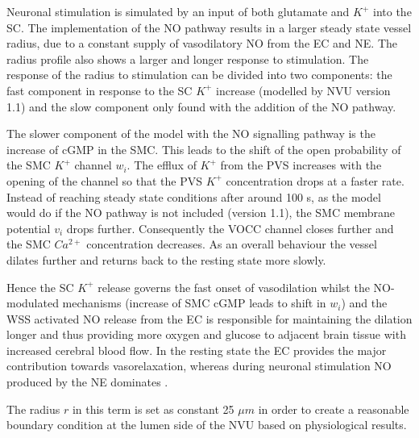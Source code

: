 		Neuronal stimulation is simulated by an input of both glutamate and $K^+$ into the SC. The implementation of the NO pathway results in a larger steady state vessel radius, due to a constant supply of vasodilatory NO from the EC and NE. The radius profile also shows a larger and longer response to stimulation. 
		The response of the radius to stimulation can be divided into two components: the fast component in response to the SC $K^+$ increase (modelled by NVU version 1.1) and the slow component only found with the addition of the NO pathway. 
		
		The slower component of the model with the NO signalling pathway is the increase of cGMP in the SMC. This leads to the shift of the open probability of the SMC $K^+$ channel $w_i$. The  efflux of $K^+$ from the PVS increases with the opening of the channel so that the PVS $K^+$ concentration drops at a faster rate. Instead of reaching steady state conditions after around 100 s, as the model would do if the NO pathway is not included (version 1.1), the SMC membrane potential $v_i$ drops further. Consequently the VOCC channel closes further and the SMC $Ca^{2+}$ concentration decreases. As an overall behaviour the vessel dilates further and returns back to the resting state more slowly. 
		
		Hence the SC $K^+$ release governs the fast onset of vasodilation whilst the NO-modulated mechanisms (increase of SMC cGMP leads to shift in $w_i$) and the WSS activated NO release from the EC is responsible for maintaining the dilation longer and thus providing more oxygen and glucose to adjacent brain tissue with increased cerebral blood flow. In the resting state the EC provides the major contribution towards vasorelaxation, whereas during neuronal stimulation NO produced by the NE dominates \citep{Dormanns2016}.	
		
		The radius $r$ in this term is set as constant 25 $\mu m$ in order to create a reasonable boundary condition at the lumen side of the NVU based on physiological results.
		
